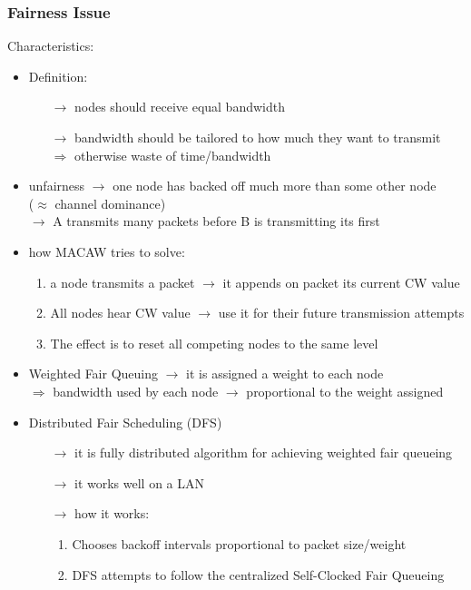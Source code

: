 \subsubsection{Fairness Issue}
Characteristics:
\begin{itemize}
    \item Definition:
    \begin{itemize}
        \item[$\rightarrow$] nodes should receive equal bandwidth
        \item[$\rightarrow$] bandwidth should be tailored to how much they want to transmit\\
        $\Rightarrow$ otherwise waste of time/bandwidth
    \end{itemize}
    \item unfairness $\rightarrow$ one node has backed
    off much more than some other node\\($\approx$ channel dominance)\\
    $\rightarrow$ A transmits many packets before B is transmitting its first
    \item how MACAW tries to solve:
    \begin{enumerate}
        \item a node transmits a packet $\rightarrow$ it appends on packet its current
        CW value
        \item All nodes hear CW value $\rightarrow$ use it for their future
        transmission attempts
        \item The effect is to reset all competing nodes to the same level
    \end{enumerate}
    \item Weighted Fair Queuing $\rightarrow$ it is assigned a weight to each node\\
    $\Rightarrow$ bandwidth used by each node $\rightarrow$ proportional to the weight
    assigned
    \newpage
    \item Distributed Fair Scheduling (DFS)
    \begin{itemize}
        \item[$\rightarrow$] it is fully distributed algorithm for achieving weighted
        fair queueing
        \item[$\rightarrow$] it works well on a LAN
        \item[$\rightarrow$] how it works:
        \begin{enumerate}
            \item Chooses backoff intervals proportional to
            packet size/weight
            \item DFS attempts to follow the centralized Self-Clocked
            Fair Queueing
        \end{enumerate}
    \end{itemize}
\end{itemize}
